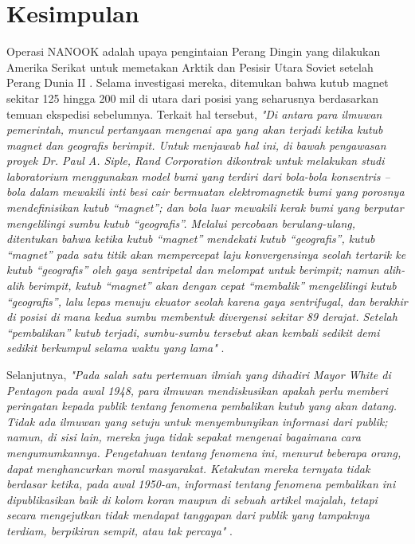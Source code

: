 \documentclass[10pt,twocolumn,letterpaper]{article}
\begin{document}
\section{Kesimpulan}

Operasi NANOOK adalah upaya pengintaian Perang Dingin yang dilakukan Amerika Serikat untuk memetakan Arktik dan Pesisir Utara Soviet setelah Perang Dunia II \cite{137}. Selama investigasi mereka, ditemukan bahwa kutub magnet sekitar 125 hingga 200 mil di utara dari posisi yang seharusnya berdasarkan temuan ekspedisi sebelumnya. Terkait hal tersebut, \textit{"Di antara para ilmuwan pemerintah, muncul pertanyaan mengenai apa yang akan terjadi ketika kutub magnet dan geografis berimpit. Untuk menjawab hal ini, di bawah pengawasan proyek Dr. Paul A. Siple, Rand Corporation dikontrak untuk melakukan studi laboratorium menggunakan model bumi yang terdiri dari bola-bola konsentris – bola dalam mewakili inti besi cair bermuatan elektromagnetik bumi yang porosnya mendefinisikan kutub “magnet”; dan bola luar mewakili kerak bumi yang berputar mengelilingi sumbu kutub “geografis”. Melalui percobaan berulang-ulang, ditentukan bahwa ketika kutub “magnet” mendekati kutub “geografis”, kutub “magnet” pada satu titik akan mempercepat laju konvergensinya seolah tertarik ke kutub “geografis” oleh gaya sentripetal dan melompat untuk berimpit; namun alih-alih berimpit, kutub “magnet” akan dengan cepat “membalik” mengelilingi kutub “geografis”, lalu lepas menuju ekuator seolah karena gaya sentrifugal, dan berakhir di posisi di mana kedua sumbu membentuk divergensi sekitar 89 derajat. Setelah “pembalikan” kutub terjadi, sumbu-sumbu tersebut akan kembali sedikit demi sedikit berkumpul selama waktu yang lama"} \cite{138,139}.

Selanjutnya, \textit{"Pada salah satu pertemuan ilmiah yang dihadiri Mayor White di Pentagon pada awal 1948, para ilmuwan mendiskusikan apakah perlu memberi peringatan kepada publik tentang fenomena pembalikan kutub yang akan datang. Tidak ada ilmuwan yang setuju untuk menyembunyikan informasi dari publik; namun, di sisi lain, mereka juga tidak sepakat mengenai bagaimana cara mengumumkannya. Pengetahuan tentang fenomena ini, menurut beberapa orang, dapat menghancurkan moral masyarakat. Ketakutan mereka ternyata tidak berdasar ketika, pada awal 1950-an, informasi tentang fenomena pembalikan ini dipublikasikan baik di kolom koran maupun di sebuah artikel majalah, tetapi secara mengejutkan tidak mendapat tanggapan dari publik yang tampaknya terdiam, berpikiran sempit, atau tak percaya"} \cite{138,139}.
\end{document}

